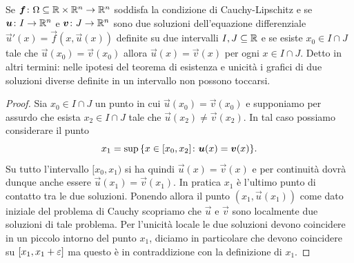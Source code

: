 \begin{proposition}
\label{prop:separazione_soluzioni}%
Se $\boldsymbol f\colon \Omega\subseteq \mathbb R \times \mathbb R^n\to \mathbb R^n$ soddisfa
la condizione di Cauchy-Lipschitz
e se $\boldsymbol u\colon I \to \mathbb R^n$ e $\boldsymbol v\colon J\to\mathbb R^n$ sono due soluzioni
dell'equazione differenziale
$\vec u'(x) = \vec f(x,\vec u(x))$
definite su due intervalli $I,J \subseteq \mathbb R$  e se esiste $x_0\in I\cap J$ tale che $\vec u(x_0) = \vec v(x_0)$ allora $\vec u(x) = \vec v(x)$ per ogni $x\in I\cap J$.
Detto in altri termini: nelle ipotesi del teorema di esistenza e unicità i grafici di due soluzioni diverse definite in un intervallo non possono toccarsi.
\end{proposition}
%
\begin{proof}
Sia $x_0 \in I\cap J$ un punto in cui $\vec u(x_0) = \vec v(x_0)$
e supponiamo per assurdo che esista $x_2 \in I\cap J$ tale che $\vec u(x_2)\neq \vec v(x_2)$. In tal caso possiamo considerare il punto
\[
   x_1 = \sup {\left\{ x \in [x_0,x_2] \colon \boldsymbol u(x) = \boldsymbol v(x) \right\}}.
\]
Su tutto l'intervallo $[x_0,x_1)$ si ha quindi $\vec u(x) = \vec v(x)$ e per continuità dovrà dunque anche essere $\vec u(x_1) =  \vec v(x_1)$.
In pratica $x_1$ è l'ultimo punto di contatto tra le due soluzioni.
Ponendo allora il punto $(x_1,\vec u(x_1))$ come dato iniziale del problema di Cauchy scopriamo che $\vec u$ e $\vec v$ sono localmente due soluzioni di tale problema. Per l'unicità locale le due soluzioni devono coincidere in un piccolo intorno del punto $x_1$, diciamo in particolare che devono coincidere su $[x_1,x_1+\varepsilon]$ ma questo è in contraddizione con la definizione di $x_1$.
\end{proof}

